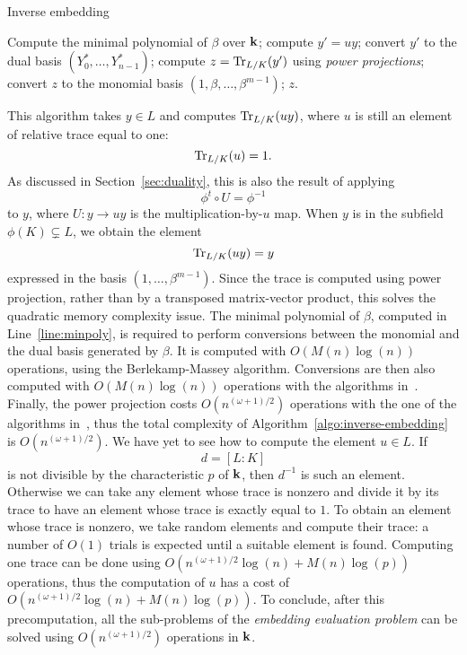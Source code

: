 \begin{algorithm}
  \caption{Inverse embedding}
  \label{algo:inverse-embedding}
  \begin{algorithmic}[1]
    \State\label{line:minpoly} Compute the minimal polynomial of $\beta$ over $\mathbf{k}$;
    \State compute $y'=uy$;
    \State convert $y'$ to the dual basis $(Y_0^*, \dots, Y_{n-1}^*)$;
    \State compute $z = \operatorname{Tr}_{L/K}(y')$ using \emph{power projections};
    \State convert $z$ to the monomial basis $(1, \beta, \dots, \beta^{m-1})$;
    \State \Return $z$.
  \end{algorithmic}
\end{algorithm}
This algorithm takes $y\in L$ and computes
$\operatorname{Tr}_{L/K}(uy)$, where $u$ is still an element of relative trace equal to one:
\[
  \operatorname{Tr}_{L/K}(u)=1.
\]
As discussed in Section~\ref{sec:duality}, this is also the result of applying
\[
  \phi^t\circ U = \phi^{-1}
\]
to $y$, where $U:y\to uy$ is the multiplication-by-$u$ map. When $y$ is in the
subfield $\phi(K)\subsetneq L$, we obtain the element
\[
  \operatorname{Tr}_{L/K}(uy) = y
\]
expressed in the basis $(1, \dots, \beta^{m-1})$. Since the trace is computed
using power projection, rather than by a transposed matrix-vector product, this
solves the quadratic memory complexity issue. The minimal polynomial of $\beta$,
computed in Line~\ref{line:minpoly}, is required to perform conversions
between the monomial and the dual basis generated by $\beta$. It is computed
with $O(M(n)\log(n))$ operations, using the Berlekamp-Massey algorithm.
Conversions are then also computed with $O(M(n)\log(n))$ operations with the
algorithms in~\cite{DDS14}. Finally, the power projection costs $O(n^{(\omega
+1)/2})$ operations with the one of the algorithms in~\cite{Shoup95, KU08}, thus
the total complexity of Algorithm~\ref{algo:inverse-embedding} is
$O(n^{(\omega+1)/2})$. We have yet to see how to compute the element $u\in L$.
If
\[
  d = [L:K]
\]
is not divisible by the characteristic $p$ of $\mathbf{k}$, then $d^{-1}$ is such an element.
Otherwise we can take any element whose trace is nonzero and divide it by its
trace to have an element whose trace is exactly equal to $1$. To obtain an
element whose trace is nonzero, we take random elements and compute
their trace: a number of $O(1)$ trials is expected until a suitable element is
found. Computing one trace can be done using
$O(n^{(\omega+1)/2}\log(n)+M(n)\log(p))$ operations, thus the computation of $u$ has
a cost of $O(n^{(\omega+1)/2}\log(n)+M(n)\log(p))$. To conclude, after this
precomputation, all the sub-problems of the \emph{embedding evaluation problem}
can be solved using $O(n^{(\omega+1)/2})$ operations in $\mathbf{k}$.

%
